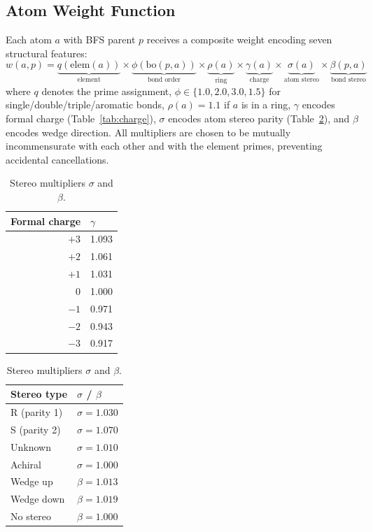 \documentclass[12pt,a4paper]{article}
\begin{document}
\subsection{Atom Weight Function}

Each atom $a$ with BFS parent $p$ receives a composite weight encoding
seven structural features:
\begin{equation}
  w(a, p) =
    \underbrace{q(\mathrm{elem}(a))}_{\text{element}}
    \times
    \underbrace{\phi(\mathrm{bo}(p,a))}_{\text{bond order}}
    \times
    \underbrace{\rho(a)}_{\text{ring}}
    \times
    \underbrace{\gamma(a)}_{\text{charge}}
    \times
    \underbrace{\sigma(a)}_{\text{atom stereo}}
    \times
    \underbrace{\beta(p,a)}_{\text{bond stereo}}
  \label{eq:weight}
\end{equation}
where $q$ denotes the prime assignment, $\phi \in \{1.0, 2.0, 3.0, 1.5\}$
for single/double/triple/aromatic bonds, $\rho(a) = 1.1$ if $a$ is in a ring,
$\gamma$ encodes formal charge (Table~\ref{tab:charge}), $\sigma$ encodes
atom stereo parity (Table~\ref{tab:stereo}), and $\beta$ encodes wedge
direction. All multipliers are chosen to be mutually incommensurate with
each other and with the element primes, preventing accidental cancellations.

\begin{table}[h]
\centering
\caption{Formal charge multipliers $\gamma$.}
\label{tab:charge}
\begin{tabular}{rl}
\toprule
Formal charge & $\gamma$ \\
\midrule
$+3$ & 1.093 \\
$+2$ & 1.061 \\
$+1$ & 1.031 \\
$0$  & 1.000 \\
$-1$ & 0.971 \\
$-2$ & 0.943 \\
$-3$ & 0.917 \\
\bottomrule
\end{tabular}
\quad
\begin{tabular}{ll}
\toprule
Stereo type & $\sigma$ / $\beta$ \\
\midrule
R (parity 1) & $\sigma = 1.030$ \\
S (parity 2) & $\sigma = 1.070$ \\
Unknown      & $\sigma = 1.010$ \\
Achiral      & $\sigma = 1.000$ \\
Wedge up     & $\beta  = 1.013$ \\
Wedge down   & $\beta  = 1.019$ \\
No stereo    & $\beta  = 1.000$ \\
\bottomrule
\end{tabular}
\caption{Stereo multipliers $\sigma$ and $\beta$.}
\label{tab:stereo}
\end{table}
\end{document}
